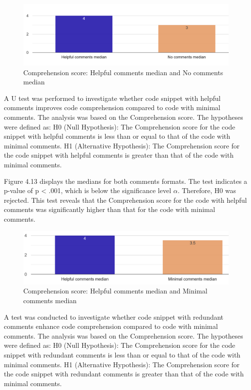 \begin{figure} [H]
  \centering
  \includegraphics[scale=0.6]{figures/h-0-q3.png}
  \caption{Comprehension score:  Helpful comments median and No comments median}
  \label{fig:AnhangsChor}
\end{figure}




A U test was performed to investigate whether code snippet with helpful comments improves code comprehension compared to code with minimal comments. The analysis was based on the Comprehension score. The hypotheses were defined as: H0 (Null Hypothesis): The Comprehension score for the code snippet with helpful comments is less than or equal to that of the code with minimal comments.  H1 (Alternative Hypothesis): The Comprehension score for the code snippet with helpful comments is greater than that of the code with minimal comments.

Figure 4.13 displays the medians for both comments formats.
The test indicates a p-value of p < .001, which is below the significance level $\alpha$. Therefore, H0 was rejected.  This test reveals that the Comprehension score for the code with helpful comments was significantly higher than that for the code with minimal comments. 

\begin{figure} [H]
  \centering
  \includegraphics[scale=0.43]{figures/h-m-q3.png}
  \caption{Comprehension score:  Helpful comments median and Minimal comments median}
  \label{fig:AnhangsChor}
\end{figure}


A test was conducted to investigate whether code snippet with redundant comments enhance code comprehension compared to code with minimal comments. The analysis was based on the Comprehension score. The hypotheses were defined as: H0 (Null Hypothesis): The Comprehension score for the code snippet with redundant comments is less than or equal to that of the code with minimal comments.  H1 (Alternative Hypothesis): The Comprehension score for the code snippet with redundant comments is greater than that of the code with minimal comments. 


